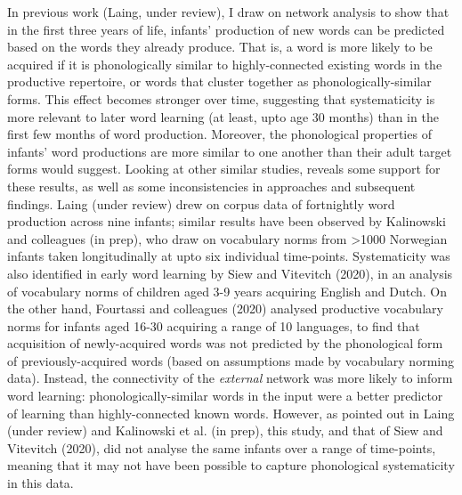 \documentclass[
  man]{apa6}
\begin{document}
In previous work (Laing, under review), I draw on network analysis to show that in the first three years of life, infants' production of new words can be predicted based on the words they already produce. That is, a word is more likely to be acquired if it is phonologically similar to highly-connected existing words in the productive repertoire, or words that cluster together as phonologically-similar forms. This effect becomes stronger over time, suggesting that systematicity is more relevant to later word learning (at least, upto age 30 months) than in the first few months of word production. Moreover, the phonological properties of infants' word productions are more similar to one another than their adult target forms would suggest. Looking at other similar studies, reveals some support for these results, as well as some inconsistencies in approaches and subsequent findings. Laing (under review) drew on corpus data of fortnightly word production across nine infants; similar results have been observed by Kalinowski and colleagues (in prep), who draw on vocabulary norms from \textgreater1000 Norwegian infants taken longitudinally at upto six individual time-points. Systematicity was also identified in early word learning by Siew and Vitevitch (2020), in an analysis of vocabulary norms of children aged 3-9 years acquiring English and Dutch. On the other hand, Fourtassi and colleagues (2020) analysed productive vocabulary norms for infants aged 16-30 acquiring a range of 10 languages, to find that acquisition of newly-acquired words was not predicted by the phonological form of previously-acquired words (based on assumptions made by vocabulary norming data). Instead, the connectivity of the \emph{external} network was more likely to inform word learning: phonologically-similar words in the input were a better predictor of learning than highly-connected known words. However, as pointed out in Laing (under review) and Kalinowski et al. (in prep), this study, and that of Siew and Vitevitch (2020), did not analyse the same infants over a range of time-points, meaning that it may not have been possible to capture phonological systematicity in this data.
\end{document}
